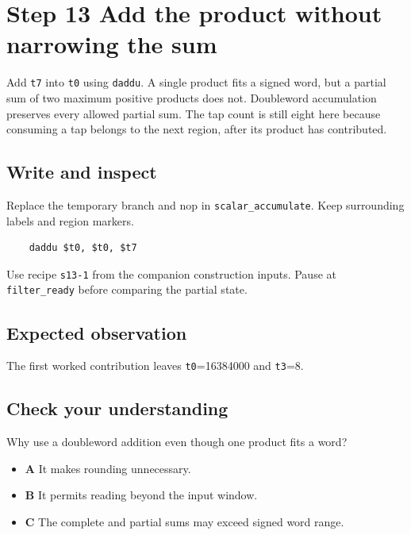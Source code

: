 \section{Step 13 Add the product without narrowing the sum}\label{fir-s13}

Add \texttt{t7} into \texttt{t0} using \texttt{daddu}. A single product fits a signed word, but a partial sum of two maximum positive products does not. Doubleword accumulation preserves every allowed partial sum. The tap count is still eight here because consuming a tap belongs to the next region, after its product has contributed.

\subsection{Write and inspect}
Replace the temporary branch and nop in \texttt{scalar\_accumulate}. Keep surrounding labels and region markers.

\begin{verbatim}
    daddu $t0, $t0, $t7
\end{verbatim}
Use recipe \texttt{s13-1} from the companion construction inputs. Pause at \texttt{filter\_ready} before comparing the partial state.

\subsection{Expected observation}
The first worked contribution leaves \texttt{t0}=16384000 and \texttt{t3}=8.

\subsection{Check your understanding}
Why use a doubleword addition even though one product fits a word?

\begin{itemize}
\item \textbf{A} It makes rounding unnecessary.
\item \textbf{B} It permits reading beyond the input window.
\item \textbf{C} The complete and partial sums may exceed signed word range.
\end{itemize}
